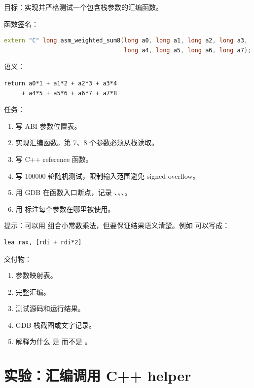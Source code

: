 \begin{labbox}
目标：实现并严格测试一个包含栈参数的汇编函数。

函数签名：

\begin{lstlisting}[language=C++]
extern "C" long asm_weighted_sum8(long a0, long a1, long a2, long a3,
                                  long a4, long a5, long a6, long a7);
\end{lstlisting}

语义：

\begin{lstlisting}
return a0*1 + a1*2 + a2*3 + a3*4
     + a4*5 + a5*6 + a6*7 + a7*8
\end{lstlisting}

任务：

\begin{enumerate}
  \item 写 ABI 参数位置表。
  \item 实现汇编函数。第 7、8 个参数必须从栈读取。
  \item 写 C++ reference 函数。
  \item 写 100000 轮随机测试，限制输入范围避免 signed overflow。
  \item 用 GDB 在函数入口断点，记录 、\code{[rsp]}、\code{[rsp + 8]}、\code{[rsp + 16]}。
  \item 用  标注每个参数在哪里被使用。
\end{enumerate}

提示：可以用  组合小常数乘法，但要保证结果语义清楚。例如  可以写成：

\begin{lstlisting}
lea rax, [rdi + rdi*2]
\end{lstlisting}

交付物：

\begin{enumerate}
  \item 参数映射表。
  \item 完整汇编。
  \item 测试源码和运行结果。
  \item GDB 栈截图或文字记录。
  \item 解释为什么  是 \code{[rsp + 8]} 而不是 \code{[rsp]}。
\end{enumerate}
\end{labbox}

\section{实验：汇编调用 C++ helper}

